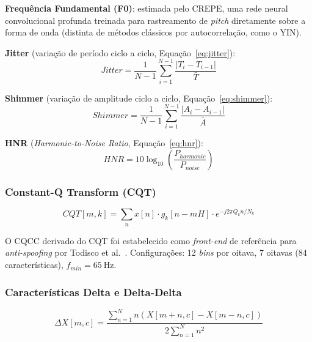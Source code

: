 \documentclass[12pt,a4paper]{article}
\begin{document}
\textbf{Frequência Fundamental (F0)}: estimada pelo CREPE, uma rede neural
convolucional profunda treinada para rastreamento de \textit{pitch} diretamente
sobre a forma de onda (distinta de métodos clássicos por autocorrelação, como
o YIN).

\textbf{Jitter} (variação de período ciclo a ciclo, Equação~\ref{eq:jitter}):
\begin{equation}
\label{eq:jitter}
Jitter = \frac{1}{N-1}\sum_{i=1}^{N-1}\frac{|T_i - T_{i-1}|}{\bar{T}}
\end{equation}

\textbf{Shimmer} (variação de amplitude ciclo a ciclo, Equação~\ref{eq:shimmer}):
\begin{equation}
\label{eq:shimmer}
Shimmer = \frac{1}{N-1}\sum_{i=1}^{N-1}\frac{|A_i - A_{i-1}|}{\bar{A}}
\end{equation}

\textbf{HNR} (\textit{Harmonic-to-Noise Ratio}, Equação~\ref{eq:hnr}):
\begin{equation}
\label{eq:hnr}
HNR = 10\log_{10}\!\left(\frac{P_{harmonic}}{P_{noise}}\right)
\end{equation}

\subsubsection{Constant-Q Transform (CQT)}

\begin{equation}
\label{eq:cqt}
CQT[m,k] = \sum_{n}x[n]\cdot g_k[n-mH]\cdot e^{-j2\pi Q_k n/N_k}
\end{equation}

O CQCC derivado do CQT foi estabelecido como \textit{front-end} de referência
para \textit{anti-spoofing} por Todisco et al.\ \cite{todisco2016new}.
Configurações: 12 \textit{bins} por oitava, 7 oitavas
(84 características), $f_{min}=\SI{65}{\hertz}$.

\subsubsection{Características Delta e Delta-Delta}

\begin{equation}
\label{eq:delta}
\Delta X[m,c] = \frac{\displaystyle\sum_{n=1}^{N}n(X[m+n,c]-X[m-n,c])}
                     {2\displaystyle\sum_{n=1}^{N}n^2}
\end{equation}

\end{document}
